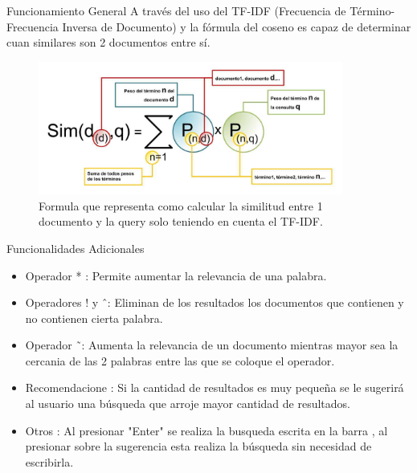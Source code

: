 \documentclass{beamer}
\begin{document}
\begin{frame}{Funcionamiento General}
    A través del uso del TF-IDF (Frecuencia
    de Término- Frecuencia Inversa de Documento) y la fórmula del coseno es capaz de determinar cuan similares son 2 documentos entre sí.
    \begin{figure}[h]
        \includegraphics[width=10cm]{1.jpg}
        \caption{Formula que representa como calcular la similitud entre 1 documento y la
            query solo teniendo en cuenta el TF-IDF.}
    \end{figure}
\end{frame}
\begin{frame}{Funcionalidades Adicionales}

    \begin{itemize}
        \item Operador * : Permite aumentar la relevancia de una palabra.
        \item Operadores ! y \^\ : Eliminan de los resultados los documentos que contienen y no contienen cierta palabra.
        \item Operador \~\ : Aumenta la relevancia de un documento mientras mayor sea la cercania de las 2 palabras entre las que se coloque el operador.
        \item Recomendacione : Si la cantidad de resultados es muy pequeña se le sugerirá al usuario una búsqueda que arroje mayor cantidad de resultados.
        \item Otros : Al presionar "Enter" se realiza la busqueda escrita en la barra , al presionar sobre la sugerencia esta realiza la búsqueda sin necesidad de escribirla.
    \end{itemize}
\end{frame}
\end{document}
